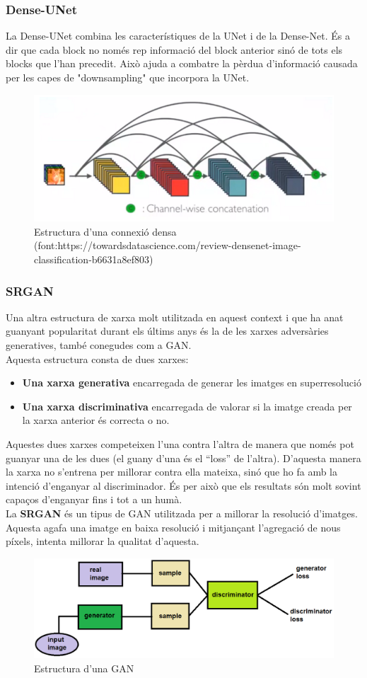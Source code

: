 ﻿\documentclass[10pt,a4paper,twocolumn,twoside]{article}
\begin{document}
\subsubsection{Dense-UNet }
La Dense-UNet \cite{DenseUNet} combina les característiques de la UNet i de la Dense-Net. És a dir que cada block no només rep informació del block anterior sinó de tots els blocks que l'han precedit. Això ajuda a combatre la pèrdua d'informació causada per les capes de "downsampling" que incorpora la UNet.
\begin{figure}[h]
\centering
\includegraphics[width=.5\textwidth]{img/dense.png}
\caption{Estructura d'una connexió densa\\ (font:https://towardsdatascience.com/review-densenet-image-classification-b6631a8ef803)}
\end{figure}

\subsubsection{SRGAN}
Una altra estructura de xarxa molt utilitzada en aquest context i que ha anat guanyant popularitat durant els últims anys és la de les xarxes adversàries generatives, també conegudes com a GAN.\\
Aquesta estructura consta de dues xarxes:
\begin{itemize}
\item\textbf{Una xarxa generativa }encarregada de generar les imatges en superresolució
\item\textbf{Una xarxa discriminativa }encarregada de valorar si la imatge creada per la xarxa anterior és correcta o no.
\end{itemize}
Aquestes dues xarxes competeixen l'una contra l'altra de manera que només pot guanyar una de les dues (el guany d'una és el ``loss'' de l'altra). D'aquesta manera la xarxa no s'entrena per millorar contra ella mateixa, sinó que ho fa amb la intenció d'enganyar al discriminador. És per això que els resultats són molt sovint capaços d'enganyar fins i tot a un humà.\\

La \textbf{SRGAN} \cite{SRGAN} és un tipus de GAN utilitzada per a millorar la resolució d'imatges. Aquesta agafa una imatge en baixa resolució i mitjançant l'agregació de nous píxels, intenta millorar la qualitat d'aquesta.
\begin{figure}[h]
\centering
\includegraphics[width=.5\textwidth]{img/GAN.png}
\caption{Estructura d'una GAN}
\end{figure}
\end{document}
